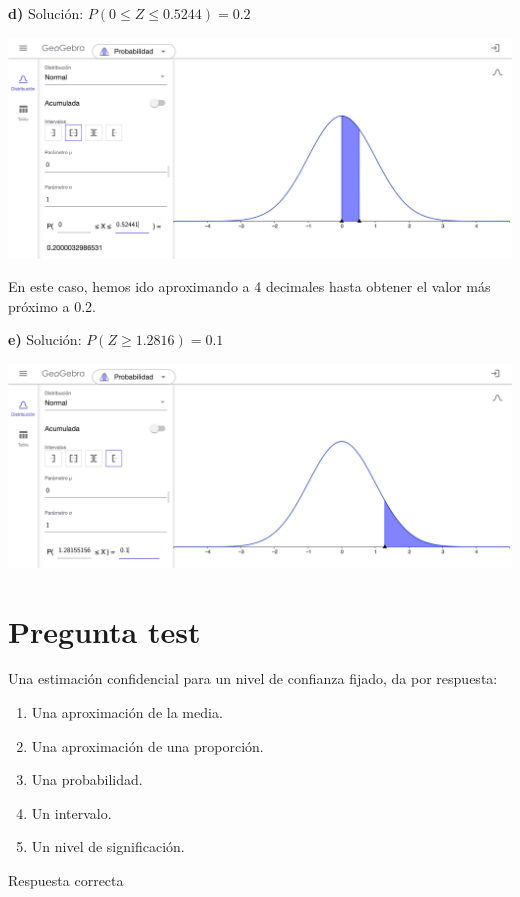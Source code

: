 \documentclass[
]{book}
\providecommand{\tightlist}{%
  \setlength{\itemsep}{0pt}\setlength{\parskip}{0pt}}
\begin{document}
\textbf{d)} Solución: \(P(0 \leq Z \leq 0.5244) = 0.2\)

\includegraphics[width=28.44in]{img/3_7}

En este caso, hemos ido aproximando a 4 decimales hasta obtener el valor más próximo a 0.2.

\textbf{e)} Solución: \(P(Z \geq 1.2816) = 0.1\)

\includegraphics[width=28.44in]{img/3_8}

\hypertarget{pregunta-test-98}{%
\section{Pregunta test}\label{pregunta-test-98}}

Una estimación confidencial para un nivel de confianza fijado, da por respuesta:

\begin{enumerate}
\def\labelenumi{\alph{enumi})}
\tightlist
\item
  Una aproximación de la media.
\item
  Una aproximación de una proporción.
\item
  Una probabilidad.
\item
  Un intervalo.
\item
  Un nivel de significación.
\end{enumerate}

Respuesta correcta
\end{document}

